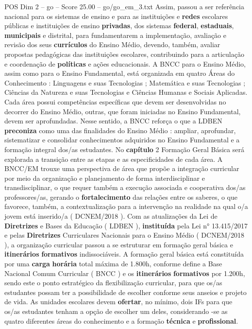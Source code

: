 \begin{textsample}{POS Dim 2 – go – Score 25.00 – go/go\_em\_3.txt}
Assim, passou a ser referência nacional para os sistemas de ensino e para as instituições e \textbf{redes} escolares públicas e instituições de ensino \textbf{privadas}, dos sistemas \textbf{federal}, \textbf{estaduais}, \textbf{municipais} e distrital, para fundamentarem a implementação, avaliação e revisão dos seus \textbf{currículos} do Ensino Médio, devendo, também, avaliar propostas pedagógicas das instituições escolares, contribuindo para a articulação e coordenação de \textbf{políticas} e ações educacionais.
A BNCC para o Ensino Médio, assim como para o Ensino Fundamental, está organizada em quatro Áreas do Conhecimento : Linguagens e suas Tecnologias ; Matemática e suas Tecnologias ; Ciências da Natureza e suas Tecnologias e Ciências Humanas e Sociais Aplicadas.
Cada área possui competências específicas que devem ser desenvolvidas no decorrer do Ensino Médio, outras, que foram iniciadas no Ensino Fundamental, devem ser aprofundadas.
Nesse sentido, a BNCC reforça o que a LDBEN \textbf{preconiza} como uma das finalidades do Ensino Médio : ampliar, aprofundar, sistematizar e consolidar conhecimentos adquiridos no Ensino Fundamental e a formação integral dos/as estudantes.
No \textbf{capítulo} 2 Formação Geral Básica será explorada a transição entre as etapas e as especificidades de cada área.
A BNCC/EM trouxe uma perspectiva de área que propõe a integração curricular por meio da organização e planejamento de forma interdisciplinar e transdisciplinar, o que requer também a execução associada e cooperativa dos/as professores/as, gerando o \textbf{fortalecimento} das relações entre os saberes, o que favorece, também, a contextualização para a intervenção na realidade na qual o/a jovem está inserido/a ( DCNEM/2018 ).
Com as atualizações da Lei de \textbf{Diretrizes} e Bases da Educação ( LDBEN ), \textbf{instituída} pela Lei n{\EmojiFont °} 13.415/2017 e pelas \textbf{Diretrizes} Curriculares Nacionais para o Ensino Médio ( DCNEM/2018 ), a organização curricular passou a se estruturar em formação geral básica e \textbf{itinerários} \textbf{formativos} indissociáveis.
A formação geral básica está constituída por uma \textbf{carga} \textbf{horária} total máxima de 1.800h, conforme define a Base Nacional Comum Curricular ( BNCC ) e os \textbf{itinerários} \textbf{formativos} por 1.200h, sendo este o ponto estratégico da flexibilização curricular, para que os/as estudantes possam ter a possibilidade de escolher conforme seus anseios e projeto de vida.
As unidades escolares devem \textbf{ofertar}, no mínimo, dois IFs para que os/as estudantes tenham a opção de escolher um deles, considerando -se as quatro diferentes áreas do conhecimento e a formação \textbf{técnica} e \textbf{profissional}.

\end{textsample}
